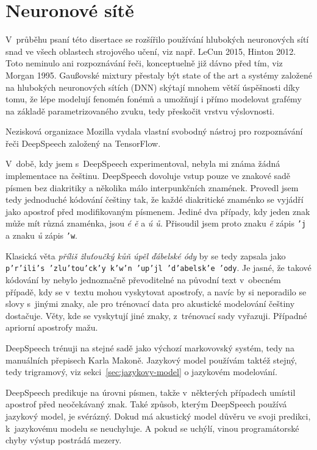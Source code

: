 \section{Neuronové sítě}
\label{sec:deepspeech}

V~průběhu psaní této disertace se rozšířilo používání hlubokých neuronových sítí
snad ve všech oblastech strojového učení, viz např. LeCun
2015\cite{lecun2015deep}, Hinton 2012\cite{hinton2012deep}. Toto neminulo ani
rozpoznávání řeči, konceptuelně již dávno před tím, viz Morgan 1995\cite{morgan1995neural}. Gaußovské mixtury
přestaly být state of the art a systémy založené na hlubokých neuronových sítích
(DNN) skýtají mnohem větší úspěšnosti díky tomu, že lépe modelují fenomén fonémů
a umožňují i přímo modelovat grafémy na základě parametrizovaného zvuku, tedy
přeskočit vrstvu výslovnosti.

Nezisková organizace Mozilla vydala vlastní svobodný nástroj pro rozpoznávání
řeči DeepSpeech\cite{hannun2014deep} založený na
TensorFlow\cite{abadi2016tensorflow}.

V~době, kdy jsem s~DeepSpeech experimentoval, nebyla mi známa žádná implementace
na češtinu. DeepSpeech dovoluje vstup pouze ve znakové sadě písmen bez
diakritiky a několika málo interpunkčních znamének. Provedl jsem
tedy jednoduché kódování češtiny tak, že každé diakritické znaménko se vyjádří
jako apostrof před modifikovaným písmenem. Jediné dva případy, kdy jeden znak
může mít různá znaménka, jsou {\em é ě} a {\em ú ů}. Přisoudil jsem proto znaku
{\em ě} zápis \texttt{'j} a znaku {\em ů} zápis \texttt{'w}.

Klasická věta {\em příliš žluťoučký kůň úpěl ďábelské ódy} by se tedy zapsala
jako \texttt{p'r'ili's 'zlu'tou'ck'y k'w'n 'up'jl 'd'abelsk'e 'ody}. Je jasné,
že takové kódování by nebylo jednoznačně převoditelné na původní text v~obecném
případě, kdy se v~textu mohou vyskytovat apostrofy, a navíc by si neporadilo se
slovy s~jinými znaky, ale pro trénovací data pro akustické modelování češtiny
dostačuje. Věty, kde se vyskytují jiné znaky, z~trénovací sady vyřazuji. Případné
apriorní apostrofy mažu.

DeepSpeech trénuji na stejné sadě jako výchozí markovovský systém, tedy na
manuálních přepisech Karla Makoně. Jazykový model používám taktéž stejný, tedy trigramový, viz
sekci~\ref{sec:jazykovy-model} o jazykovém modelování.

DeepSpeech predikuje na úrovni písmen, takže v~některých případech umístil
apostrof před neočekávaný znak. Také způsob, kterým DeepSpeech používá jazykový
model, je svérázný. Dokud má akustický model důvěru ve svoji predikci,
k~jazykovému modelu se neuchyluje. A pokud se uchýlí, vinou programátorské chyby
výstup postrádá mezery.

